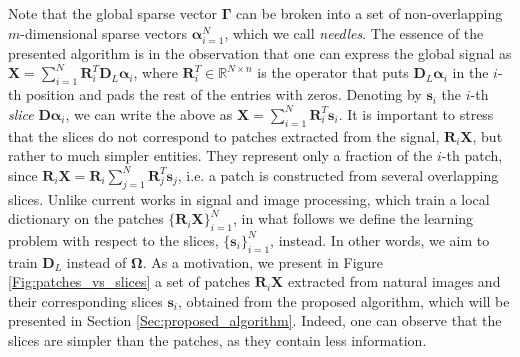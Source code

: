 \documentclass[10pt,twocolumn,letterpaper]{article}
\def\s{{\mathbf s}}
\def\X{{\mathbf X}}
\def\D{{\mathbf D}}
\def\R{{\mathbf R}}
\def\alfa{{\boldsymbol \alpha}}
\def\Gama{{\boldsymbol \Gamma}}
\def\Om{{\boldsymbol \Omega}}
\begin{document}
Note that the global sparse vector $\Gama$ can be broken into a set of non-overlapping $m$-dimensional sparse vectors $\alfa_{i=1}^N$, which we call \textit{needles}. The essence of the presented algorithm is in the observation that one can express the global signal as $\X = \sum_{i=1}^N \R_i^T \D_L \alfa_i$, where $\R_i^T \in \mathbb{R}^{N \times n}$ is the operator that puts $\D_L \alfa_i$ in the $i$-th position and pads the rest of the entries with zeros. Denoting by $\s_i$ the $i$-th \textit{slice} $\D \alfa_i$, we can write the above as $\X = \sum_{i=1}^N \R_i^T \s_i$. It is important to stress that the slices do not correspond to patches extracted from the signal, $\R_i \X$, but rather to much simpler entities. They represent only a fraction of the $i$-th patch, since $\R_i \X = \R_i \sum_{j=1}^N \R_j^T \s_j$, i.e. a patch is constructed from several overlapping slices. Unlike current works in signal and image processing, which train a local dictionary on the patches $\{ \R_i \X \}_{i=1}^N$, in what follows we define the learning problem with respect to the slices, $\{ \s_i \}_{i=1}^N$, instead. In other words, we aim to train $\D_L$ instead of $\Om$. As a motivation, we present in Figure \ref{Fig:patches_vs_slices} a set of patches $\R_i \X$ extracted from natural images and their corresponding slices $\s_i$, obtained from the proposed algorithm, which will be presented in Section \ref{Sec:proposed_algorithm}. Indeed, one can observe that the slices are simpler than the patches, as they contain less information.
\end{document}
